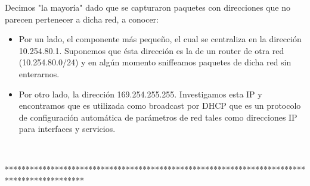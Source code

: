 Decimos "la mayoría" dado que se capturaron paquetes con direcciones que no 
parecen pertenecer a dicha red, a conocer:

\begin{itemize}
	\item Por un lado, el componente más pequeño, el cual se centraliza 
en la dirección 10.254.80.1. Suponemos que ésta dirección es la de un router
de otra red (10.254.80.0/24) y en algún momento sniffeamos paquetes de dicha 
red sin enterarnos.
	\item Por otro lado, la dirección 169.254.255.255. Investigamos esta
IP y encontramos que es utilizada como broadcast por DHCP que es un protocolo
de configuración automática de parámetros de red tales como direcciones IP
para interfaces y servicios.
\end{itemize} 


~


*******************************************************************************************


